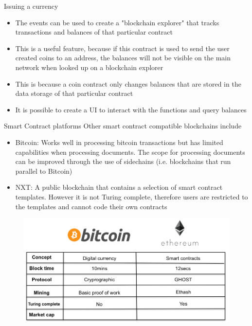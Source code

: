 \documentclass[9pt]{beamer}
\begin{document}
\begin{frame}{Issuing a currency}
	\begin{itemize}
		\item The events can be used to create a "blockchain explorer" that tracks transactions and balances of that particular contract
		\item This is a useful feature, because if this contract is used to send the user created coins to an address, the balances will not be visible on the main network when looked up on a blockchain explorer
		\item This is because a coin contract only changes balances that are stored in the data storage of that particular contract
		\item It is possible to create a UI to interact with the functions and query balances
	\end{itemize}
\end{frame}


\begin{frame}{Smart Contract platforms}
	Other smart contract compatible blockchains include
	\begin{itemize}
		\item Bitcoin: Works well in processing bitcoin transactions but has limited capabilities when processing documents. The scope for processing documents can be improved through the use of sidechains (i.e. blockchains that run parallel to Bitcoin)
		\item NXT: A public blockchain that contains a selection of smart contract templates. However it is not Turing complete, therefore users are restricted to the templates and cannot code their own contracts
	\end{itemize}
\end{frame}


\begin{frame}
	\begin{figure}[]
		\centering
		\includegraphics  [scale=0.25]{Images/btcvseth}
	\end{figure}
\end{frame}
\end{document}
